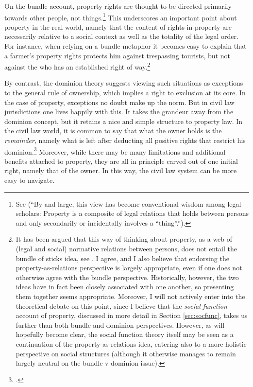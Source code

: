 On the bundle account, property rights are thought to be directed primarily towards other people, not things.\footnote{See \cite[357-358]{merrill01} (``By and large, this view has become conventional wisdom among legal scholars: Property is a composite of legal relations that holds between persons and only secondarily or incidentally involves a ``thing''.'').} This underscores an important point about property in the real world, namely that the content of rights in property are necessarily relative to a social context as well as the totality of the legal order. For instance, when relying on a bundle metaphor it becomes easy to explain that a farmer's property rights protects him against trespassing tourists, but not against the  who has an established right of way.\footnote{It has been argued that this way of thinking about property, as a web of (legal and social) normative relations between persons, does not entail the bundle of sticks idea, see \cite[23-25]{dorfman10}. I agree, and I also believe that endorsing the property-as-relations perspective is largely appropriate, even if one does not otherwise agree with the bundle perspective. Historically, however, the two ideas have in fact been closely associated with one another, so presenting them together seems appropriate. Moreover, I will not actively enter into the theoretical debate on this point, since I believe that the {\it social function} account of property, discussed in more detail in Section \ref{sec:socfunc}, takes us further than both bundle and dominion perspectives. However, as will hopefully become clear, the social function theory itself may be seen as a continuation of the property-as-relations idea, catering also to a more holistic perspective on social structures (although it otherwise manages to remain largely neutral on the bundle v dominion issue).}

By contrast, the dominion theory suggests viewing such situations as exceptions to the general rule of ownership, which implies a right to exclusion at its core. In the case of property, exceptions no doubt make up the norm. But in civil law jurisdictions one lives happily with this. It takes the grandeur away from the dominion concept, but it retains a nice and simple structure to property law. In the civil law world, it is common to say that what the owner holds is the {\it remainder}, namely what is left after deducting all positive rights that restrict his dominion.\footcite[25]{chang12} Moreover, while there may be many limitations and additional benefits attached to property, they are all in principle carved out of one initial right, namely that of the owner. In this way, the civil law system can be more easy to navigate.

